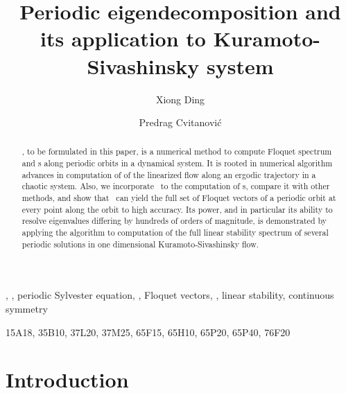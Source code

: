 \documentclass[final,leqno,onefignum,onetabnum]{siamltexmm}
\title{
Periodic eigendecomposition and its application to
Kuramoto-Sivashinsky system
}
\author{
  Xiong Ding\footnotemark[2]
  \and
  Predrag Cvitanovi\'{c}\footnotemark[2]
}
\begin{document}
\maketitle
\newcommand{\slugmaster}{%
\slugger{siads}{xxxx}{xx}{x}{x--x}}

\renewcommand{\thefootnote}{\fnsymbol{footnote}}

\begin{abstract}
\Ped, to be formulated in this paper,
is a numerical method to compute Floquet spectrum and \Fv s along
periodic orbits in a dynamical system. It is rooted in
numerical algorithm advances in computation
of {\cLvs}
of the linearized flow along an ergodic trajectory in a chaotic
system. Also, we incorporate \psd\ to the computation of
\Fv s, compare it with other
methods, and show that \ped\ can yield
{the full set of Floquet vectors}
of a periodic orbit at every point along the orbit to high accuracy.
Its power, and in particular its ability to resolve eigenvalues
differing by hundreds of orders of magnitude, is demonstrated by
applying the algorithm to computation of the full linear stability
spectrum of several periodic solutions in one dimensional
Kuramoto-Sivashinsky flow.
\end{abstract}

\begin{keywords}
\ped, \psd, periodic Sylvester equation,
{\cLvs}, Floquet
vectors, \KS, linear stability, continuous symmetry
\end{keywords}

\begin{AMS}
  15A18, 35B10, 37L20, 37M25, 65F15, 65H10, 65P20, 65P40, 76F20
\end{AMS}
\pagestyle{myheadings}
\thispagestyle{plain}

\section{Introduction}
\label{sect:intro}
\end{document}
